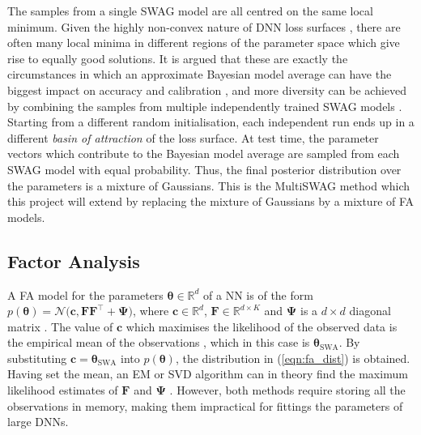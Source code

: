 \documentclass[a4paper,11pt]{article}
\newcommand{\matr}[1]{\mathbf{#1}}
\newcommand{\bgreek}[1]{\boldsymbol{#1}}
\newcommand{\R}{\mathbb R}
\begin{document}
The samples from a single SWAG model are all centred on the same local minimum. Given the highly non-convex nature of DNN loss surfaces \cite{li2017}, there are often many local minima in different regions of the parameter space which give rise to equally good solutions. It is argued that these are exactly the circumstances in which an approximate Bayesian model average can have the biggest impact on accuracy and calibration \cite{wilson2020}, and more diversity can be achieved by combining the samples from multiple independently trained SWAG models \cite{izmailov2020}. 
Starting from a different random initialisation, each independent run ends up in a different \emph{basin of attraction} of the loss surface. 
At test time, the parameter vectors which contribute to the Bayesian model average are sampled from each SWAG model with equal probability. Thus, the final posterior distribution over the parameters is a mixture of Gaussians. This is the MultiSWAG method which this project will extend by replacing the mixture of Gaussians by a mixture of FA models.

\subsection{Factor Analysis}\label{sec:fa}

A FA model for the parameters $\bgreek{\theta} \in \R^d$ of a NN is of the form $p(\bgreek{\theta}) = \mathcal{N}\big(\matr{c}, \matr{FF}^{\intercal} + \matr{\Psi}\big)$, where $\matr{c} \in \R^d$, $\matr{F} \in \R^{d \times K}$ and $\matr{\Psi}$ is a $d\times d$ diagonal matrix \cite{barber2007}. The value of $\matr{c}$ which maximises the likelihood of the observed data is the empirical mean of the observations \cite{barber2007}, which in this case is $\bgreek{\theta}_{\text{SWA}}$. By substituting $\matr{c} = \bgreek{\theta}_{\text{SWA}}$ into $p(\bgreek{\theta})$, the distribution in (\ref{eqn:fa_dist}) is obtained. Having set the mean, an EM or SVD algorithm can in theory find the maximum likelihood estimates of $\matr{F}$ and $\matr{\Psi}$ \cite{barber2007}. 
However, both methods require storing all the observations in memory, making them impractical for fittings the parameters of large DNNs. 

\end{document}
